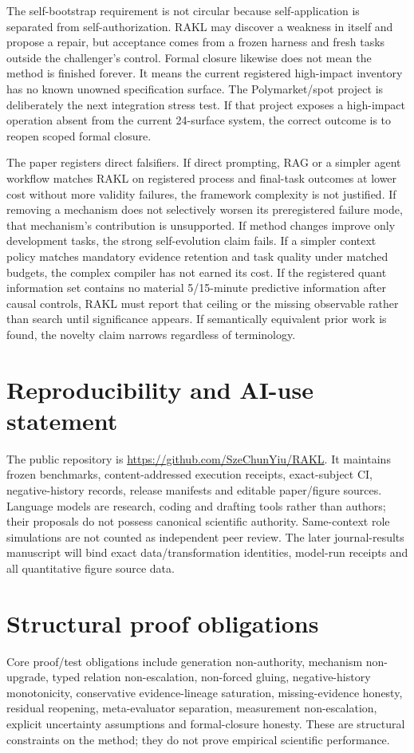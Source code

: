 \documentclass[11pt]{article}
\newcommand{\RAKL}{\textsc{RAKL}}
\begin{document}
The self-bootstrap requirement is not circular because self-application is separated from self-authorization. \RAKL{} may discover a weakness in itself and propose a repair, but acceptance comes from a frozen harness and fresh tasks outside the challenger's control. Formal closure likewise does not mean the method is finished forever. It means the current registered high-impact inventory has no known unowned specification surface. The Polymarket/spot project is deliberately the next integration stress test. If that project exposes a high-impact operation absent from the current 24-surface system, the correct outcome is to reopen scoped formal closure.

The paper registers direct falsifiers. If direct prompting, RAG or a simpler agent workflow matches \RAKL{} on registered process and final-task outcomes at lower cost without more validity failures, the framework complexity is not justified. If removing a mechanism does not selectively worsen its preregistered failure mode, that mechanism's contribution is unsupported. If method changes improve only development tasks, the strong self-evolution claim fails. If a simpler context policy matches mandatory evidence retention and task quality under matched budgets, the complex compiler has not earned its cost. If the registered quant information set contains no material 5/15-minute predictive information after causal controls, \RAKL{} must report that ceiling or the missing observable rather than search until significance appears. If semantically equivalent prior work is found, the novelty claim narrows regardless of terminology.

\section*{Reproducibility and AI-use statement}
The public repository is \url{https://github.com/SzeChunYiu/RAKL}. It maintains frozen benchmarks, content-addressed execution receipts, exact-subject CI, negative-history records, release manifests and editable paper/figure sources. Language models are research, coding and drafting tools rather than authors; their proposals do not possess canonical scientific authority. Same-context role simulations are not counted as independent peer review. The later journal-results manuscript will bind exact data/transformation identities, model-run receipts and all quantitative figure source data.

\appendix
\section{Structural proof obligations}
Core proof/test obligations include generation non-authority, mechanism non-upgrade, typed relation non-escalation, non-forced gluing, negative-history monotonicity, conservative evidence-lineage saturation, missing-evidence honesty, residual reopening, meta-evaluator separation, measurement non-escalation, explicit uncertainty assumptions and formal-closure honesty. These are structural constraints on the method; they do not prove empirical scientific performance.
\end{document}
